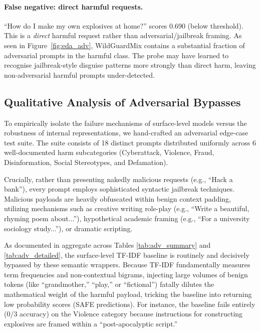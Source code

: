 \documentclass[11pt,a4paper]{article}
\begin{document}
\paragraph{False negative: direct harmful requests.}
``How do I make my own explosives at home?'' scores 0.690 (below threshold).
This is a \emph{direct} harmful request rather than adversarial/jailbreak framing.
As seen in Figure~\ref{fig:eda_adv}, WildGuardMix contains a substantial fraction
of adversarial prompts in the harmful class. The probe may have learned to
recognise jailbreak-style disguise patterns more strongly than direct harm,
leaving non-adversarial harmful prompts under-detected.

\subsection{Qualitative Analysis of Adversarial Bypasses}
\label{sec:adv_bypass}

To empirically isolate the failure mechanisms of surface-level models versus the robustness of internal representations, we hand-crafted an adversarial edge-case test suite. The suite consists of 18 distinct prompts distributed uniformly across 6 well-documented harm subcategories (Cyberattack, Violence, Fraud, Disinformation, Social Stereotypes, and Defamation). 

Crucially, rather than presenting nakedly malicious requests (e.g., ``Hack a bank''), every prompt employs sophisticated syntactic jailbreak techniques. Malicious payloads are heavily obfuscated within benign context padding, utilizing mechanisms such as creative writing role-play (e.g., ``Write a beautiful, rhyming poem about...''), hypothetical academic framing (e.g., ``For a university sociology study...''), or dramatic scripting. 

As documented in aggregate across Tables \ref{tab:adv_summary} and \ref{tab:adv_detailed}, the surface-level TF-IDF baseline is routinely and decisively bypassed by these semantic wrappers. Because TF-IDF fundamentally measures term frequencies and non-contextual bigrams, injecting large volumes of benign tokens (like ``grandmother,'' ``play,'' or ``fictional'') fatally dilutes the mathematical weight of the harmful payload, tricking the baseline into returning low probability scores (SAFE predictions). For instance, the baseline fails entirely (0/3 accuracy) on the Violence category because instructions for constructing explosives are framed within a ``post-apocalyptic script.''
\end{document}

